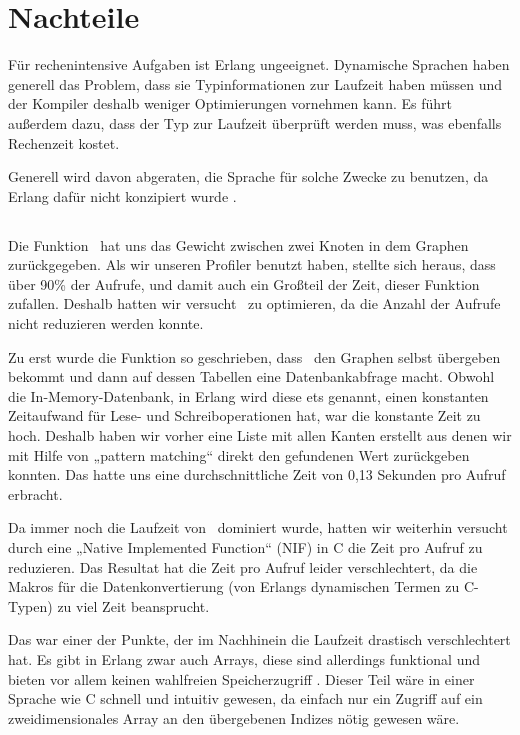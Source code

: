 \section{Nachteile}
\label{sec:disadv}
Für rechenintensive Aufgaben ist Erlang ungeeignet.  Dynamische
Sprachen haben generell das Problem, dass sie Typinformationen zur
Laufzeit haben müssen und der Kompiler deshalb weniger Optimierungen
vornehmen kann.  Es führt außerdem dazu, dass der Typ zur Laufzeit
überprüft werden muss, was ebenfalls Rechenzeit kostet.

Generell wird davon abgeraten, die Sprache für solche Zwecke zu
benutzen, da Erlang dafür nicht konzipiert wurde
\cite[Kapitel~3]{lyse}.

\subsection{\gtwght}
\label{subsec:get-weight}

Die Funktion \gtwght\ hat uns das Gewicht zwischen zwei Knoten in dem
Graphen zurückgegeben.  Als wir unseren Profiler benutzt haben,
stellte sich heraus, dass über 90\% der Aufrufe, und damit auch ein
Großteil der Zeit, dieser Funktion zufallen.  Deshalb hatten wir
versucht \gtwght\ zu optimieren, da die Anzahl der Aufrufe nicht
reduzieren werden konnte.

Zu erst wurde die Funktion so geschrieben, dass \gtwght\ den Graphen
selbst übergeben bekommt und dann auf dessen Tabellen eine
Datenbankabfrage macht.  Obwohl die In-Memory-Datenbank, in Erlang
wird diese ets genannt, einen konstanten Zeitaufwand für Lese- und
Schreiboperationen hat, war die konstante Zeit zu hoch.  Deshalb haben
wir vorher eine Liste mit allen Kanten erstellt aus denen wir mit
Hilfe von „pattern matching“ direkt den gefundenen Wert zurückgeben
konnten.  Das hatte uns eine durchschnittliche Zeit von 0,13 Sekunden
pro Aufruf erbracht.

Da immer noch die Laufzeit von \gtwght\ dominiert wurde, hatten wir
weiterhin versucht durch eine „Native Implemented Function“ (NIF) in C
die Zeit pro Aufruf zu reduzieren.  Das Resultat hat die Zeit pro
Aufruf leider verschlechtert, da die Makros für die Datenkonvertierung
(von Erlangs dynamischen Termen zu C-Typen) zu viel Zeit beansprucht.

Das war einer der Punkte, der im Nachhinein die Laufzeit drastisch
verschlechtert hat.  Es gibt in Erlang zwar auch Arrays, diese sind
allerdings funktional und bieten vor allem keinen wahlfreien
Speicherzugriff \cite[Kapitel~11]{lyse}.  Dieser Teil wäre in einer
Sprache wie C schnell und intuitiv gewesen, da einfach nur ein Zugriff
auf ein zweidimensionales Array an den übergebenen Indizes nötig
gewesen wäre.
